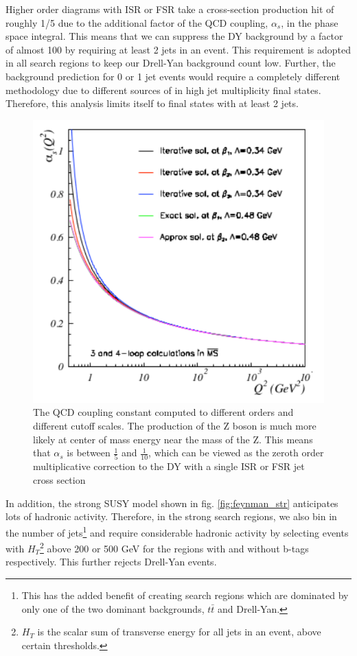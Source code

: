       Higher order diagrams with ISR or FSR take a cross-section production hit of roughly 1/5 due to the additional factor of the QCD coupling, $\alpha_s$, in the phase space integral. This means that we can suppress the DY background by a factor of almost 100 by requiring at least 2 jets in an event. This requirement is adopted in all search regions to keep our Drell-Yan background count low. Further, the background prediction for 0 or 1 jet events would require a completely different methodology due to different sources of \MET in high jet multiplicity final states. Therefore, this analysis limits itself to final states with at least 2 jets. 

      \begin{figure}[h!]
        \centering
        \includegraphics[width=.5\textwidth]{figures/QCD_Coupling_Running.pdf}
        \caption[The QCD coupling constant computed to different orders and different cutoff scales.]{The QCD coupling constant computed to different orders and different cutoff scales. The production of the Z boson is much more likely at center of mass energy near the mass of the Z. This means that $\alpha_s$ is between $\frac{1}{5}$ and $\frac{1}{10}$, which can be viewed as the zeroth order multiplicative correction to the DY with a single ISR or FSR jet cross section} 
        \label{fig:alpha_s_running}
      \end{figure}

      In addition, the strong SUSY model shown in fig. \ref{fig:feynman_str} anticipates lots of hadronic activity. Therefore, in the strong search regions, we also bin in the number of jets\footnote{This has the added benefit of creating search regions which are dominated by only one of the two dominant backgrounds, $t\bar{t}$ and Drell-Yan.} and require considerable hadronic activity by selecting events with $H_T$\footnote{$H_T$ is the scalar sum of transverse energy for all jets in an event, above certain thresholds.} above 200 or 500 GeV for the regions with and without b-tags respectively. This further rejects Drell-Yan events.


